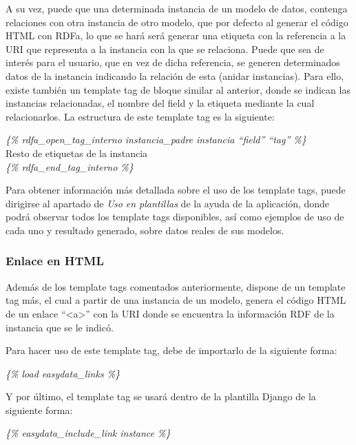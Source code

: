 A su vez, puede que una determinada instancia de un modelo de datos, contenga
relaciones con otra instancia de otro modelo, que por defecto al generar el
código HTML con RDFa, lo que se hará será generar una etiqueta con la
referencia a la URI que representa a la instancia con la que se relaciona. Puede
que sea de interés para el usuario, que en vez de dicha referencia, se generen
determinados datos de la instancia indicando la relación de esta (anidar
instancias). Para ello, existe también un template tag de bloque similar al
anterior, donde se indican las instancias relacionadas, el nombre del field y la
etiqueta mediante la cual relacionarlos. La estructura de este template tag es
la siguiente:
\begin{center}
    \textit{\{\% rdfa\_open\_tag\_interno instancia\_padre instancia ``field'' ``tag'' \%\}}\\
    Resto de etiquetas de la instancia\\
    \textit{\{\% rdfa\_end\_tag\_interno \%\}}\\
\end{center}

Para obtener información más detallada sobre el uso de los template tags, puede
dirigirse al apartado de \textit{Uso en plantillas} de la ayuda de la
aplicación, donde podrá observar todos los template tags disponibles, así como
ejemplos de uso de cada uno y resultado generado, sobre datos reales de sus
modelos.

\subsubsection{Enlace en HTML}

Además de los template tags comentados anteriormente, dispone de un template tag
más, el cual a partir de una instancia de un modelo, genera el código HTML de un
enlace ``<a>'' con la URI donde se encuentra la información RDF de la instancia
que se le indicó.

Para hacer uso de este template tag, debe de importarlo de la siguiente forma:

\begin{center}
    \textit{\{\% load easydata\_links \%\}}
\end{center}

Y por último, el template tag se usará dentro de la plantilla Django de la
siguiente forma:

\begin{center}
    \textit{\{\% easydata\_include\_link instance \%\}}
\end{center}


